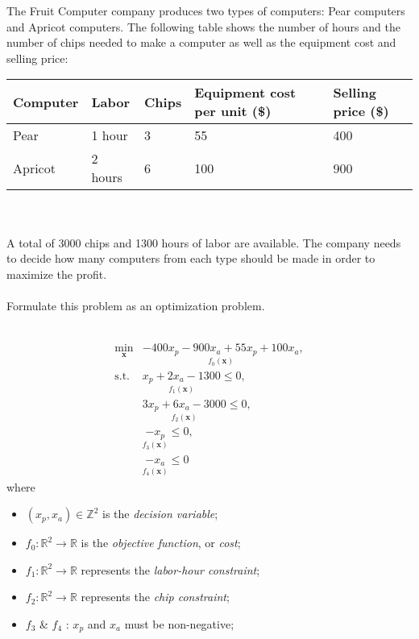 \begin{homeworkProblem}
    The Fruit Computer company produces two types of computers: Pear computers 
    and Apricot computers. The following table shows the number of hours and 
    the number of chips needed to make a computer as well as the equipment cost
    and selling price:
    \\
    
    \begin{tabular}{ l l l l l }
        \hline
        Computer & Labor & Chips & Equipment cost per unit (\$) & Selling price (\$) \\ \hline
        Pear & 1 hour & 3 & 55 & 400 \\ 
        Apricot & 2 hours & 6 & 100 & 900 \\
        \hline
    \end{tabular}
    \\ \\
    
    A total of 3000 chips and 1300 hours of labor are available. The company 
    needs to decide how many computers from each type should be made in order to 
    maximize the profit.
    \\ \\
    Formulate this problem as an optimization problem.
    \\ \\
    \begin{solution}
        \[
        \begin{array}{rl}
        \min\limits_{\boldsymbol{x}} & \underset{f_0(\boldsymbol{x})}{\boxed{-400x_p - 900x_a + 55x_p + 100x_a}}, \\ [3ex]
        \text{s.t.} & \underset{f_1(\boldsymbol{x})}{\boxed{x_p + 2x_a - 1300}} \leq 0, \\ [3ex]
                    & \underset{f_2(\boldsymbol{x})}{\boxed{3x_p + 6x_a - 3000}} \leq 0, \\ [3ex]
                    & \underset{f_3(\boldsymbol{x})}{\boxed{-x_p}} \leq 0, \\ [3ex]
                    & \underset{f_4(\boldsymbol{x})}{\boxed{-x_a}} \leq 0
        \end{array}
        \]
        where
        \begin{itemize}
            \item $(x_p, x_a) \in \mathbb{Z}^2$ is the \textit{decision variable};
            \item $f_0 : \mathbb{R}^2 \to \mathbb{R}$ is the \textit{objective function}, or \textit{cost};
            \item $f_1 : \mathbb{R}^2 \to \mathbb{R}$ represents the \textit{labor-hour constraint};
            \item $f_2 : \mathbb{R}^2 \to \mathbb{R}$ represents the \textit{chip constraint};
            \item $f_3$ \& $f_4$ : $x_p$ and $x_a$ must be non-negative;
        \end{itemize}
    \end{solution}
    

\end{homeworkProblem}